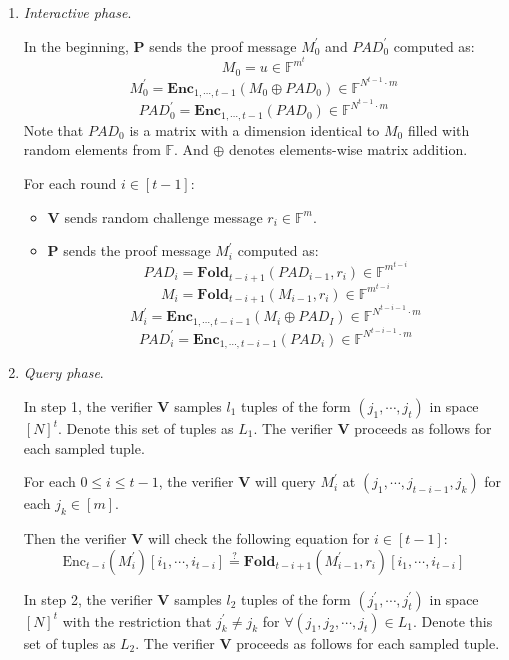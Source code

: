 \begin{enumerate}
    \item \textit{Interactive phase}. 
    
    In the beginning, $\textbf{P}$ sends the proof message $M_0^{\prime}$ and $PAD_0^{\prime}$ computed as:
$$
    M_0 = u \in \mathbb{F}^{m^t}
$$
$$
    M_0^{\prime} = \textbf{Enc}_{1,\cdots,t-1}(M_0 \oplus PAD_0) \in \mathbb{F}^{N^{t-1} \cdot m}
$$
$$
    PAD_0^{\prime} = \textbf{Enc}_{1,\cdots,t-1}(PAD_0) \in \mathbb{F}^{N^{t-1} \cdot m}
$$
    Note that $PAD_0$ is a matrix with a dimension identical to $M_0$ filled with random elements from $\mathbb{F}$. And $\oplus$ denotes elements-wise matrix addition.
    
    For each round $i \in [t-1]$:
    \begin{itemize}
        \item $\textbf{V}$ sends random challenge message $r_i \in \mathbb{F}^m$.
        \item $\textbf{P}$ sends the proof message $M_i^{\prime}$ computed as:
$$
    PAD_i = \textbf{Fold}_{t-i+1}(PAD_{i-1}, r_i) \in \mathbb{F}^{m^{t-i}}
$$
$$
    M_i = \textbf{Fold}_{t-i+1}(M_{i-1}, r_i) \in \mathbb{F}^{m^{t-i}}
$$
$$
    M_i^\prime =  \textbf{Enc}_{1, \cdots, t- i - 1}(M_i \oplus PAD_I) \in \mathbb{F}^{N^{t-i-1} \cdot m}
$$
$$
    PAD_i^\prime =  \textbf{Enc}_{1, \cdots, t- i - 1}(PAD_i) \in \mathbb{F}^{N^{t-i-1} \cdot m}
$$

    \end{itemize}
    \item \textit{Query phase}. 
    
    In step 1, the verifier $\textbf{V}$ samples $l_1$ tuples of the form $(j_1, \cdots, j_t)$ in space $[N]^t$. Denote this set of tuples as $L_1$.
    The verifier $\textbf{V}$ proceeds as follows for each sampled tuple.
    
    For each $0 \le i \le t-1$, 
    the verifier $\textbf{V}$ will query $M_{i}^{\prime}$ at $(j_1, \cdots, j_{t-i-1}, j_k)$ for each $j_k \in [m]$. 
    
    Then the verifier $\textbf{V}$ will check the following equation for $i \in [t-1]$:
\begin{equation}
\label{eq:szkpctc_eq}
    \text{Enc}_{t-i}(M_i^\prime)[i_1, \cdots, i_{t-i}] \stackrel{?}{=} \textbf{Fold}_{t-i+1}(M_{i-1}^\prime, r_i) [i_1, \cdots, i_{t-i}]
\end{equation}

    In step 2, the verifier $\textbf{V}$ samples $l_2$ tuples of the form $(j_1^\prime, \cdots, j_t^\prime)$ in space $[N]^t$ with the restriction that $j_k^\prime \neq j_k$ for $\forall (j_1, j_2, \cdots, j_t) \in L_1$. Denote this set of tuples as $L_2$.
    The verifier $\textbf{V}$ proceeds as follows for each sampled tuple.
    

\end{enumerate}
